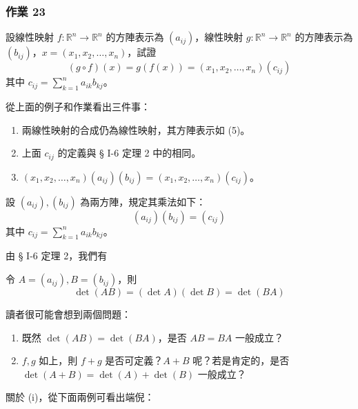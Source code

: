 \subsubsection*{作業 23}\label{hw:b6s-1-23}
設線性映射 $f: \mathbb{R}^n \longrightarrow \mathbb{R}^n$ 的方陣表示為 $(a_{ij})$，線性映射 $g: \mathbb{R}^n \longrightarrow \mathbb{R}^n$ 的方陣表示為 $(b_{ij})$，$x=(x_1, x_2, \dots, x_n)$，試證
\begin{equation}
(g \circ f)(x) = g(f(x)) = (x_1, x_2, \dots, x_n)(c_{ij}) \label{eq:b6s-1-7-5}
\end{equation}
其中 $c_{ij} = \sum_{k=1}^n a_{ik} b_{kj}$。

從上面的例子和作業看出三件事：
\begin{enumerate}[label=(\roman*), leftmargin=2em]
  \item 兩線性映射的合成仍為線性映射，其方陣表示如 (5)。
  \item 上面 $c_{ij}$ 的定義與 § I-6 定理 2 中的相同。
  \item $(x_1, x_2, \dots, x_n)(a_{ij})(b_{ij}) = (x_1, x_2, \dots, x_n)(c_{ij})$。
\end{enumerate}

\begin{definition*}\label{def:b6s-1-9}
設 $(a_{ij}), (b_{ij})$ 為兩方陣，規定其乘法如下：
\begin{equation}
(a_{ij})(b_{ij}) = (c_{ij}) \label{eq:b6s-1-7-6}
\end{equation}
其中 $c_{ij} = \sum_{k=1}^n a_{ik} b_{kj}$。
\end{definition*}

由 § I-6 定理 2，我們有

\begin{prop}\label{prop:b6s-1-1}
令 $A=(a_{ij}), B=(b_{ij})$，則
\[ \det(AB) = (\det A)(\det B) = \det(BA) \]
\end{prop}

讀者很可能會想到兩個問題：
\begin{enumerate}[label=(\roman*), leftmargin=2em]
  \item 既然 $\det(AB) = \det(BA)$，是否 $AB=BA$ 一般成立？
  \item $f, g$ 如上，則 $f+g$ 是否可定義？$A+B$ 呢？若是肯定的，是否 $\det(A+B) = \det(A) + \det(B)$ 一般成立？
\end{enumerate}

關於 (i)，從下面兩例可看出端倪：

